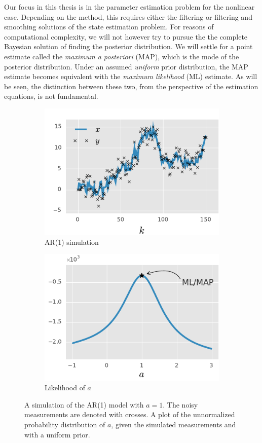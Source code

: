 Our focus in this thesis is in the parameter estimation problem for the nonlinear case.
Depending on the method, this requires either the filtering or filtering and smoothing
solutions of the state estimation problem. For reasons of computational complexity, we will not however try to pursue
the the complete Bayesian solution of finding the posterior distribution. We will settle
for a point estimate called the \emph{maximum a posteriori} (MAP), which is the mode
of the posterior distribution. Under an assumed \emph{uniform} prior distribution,
the MAP estimate becomes equivalent with the \emph{maximum likelihood} (ML) estimate.
As will be seen, the distinction between these two, from the perspective of the
estimation equations, is not fundamental.
%
% 
\begin{figure}[htb]%
    \centering%
    \begin{subfigure}[t]{0.5\textwidth}%
    	\caption{AR(1) simulation}\label{fig:ar1_simulation}%
    	\includegraphics{img/ar1_ex_a}%
    \end{subfigure}%
    \begin{subfigure}[t]{0.5\textwidth}\centering%
		\caption{Likelihood of $a$}\label{fig:ar1_lh}%
		\includegraphics{img/ar1_ex_b}%
    \end{subfigure}%
	\caption{%
	 A simulation of the AR(1) model with $a=1$.%
   	The noisy measurements are denoted with crosses. %
   	 A plot of the unnormalized probability distribution of $a$, given the simulated measurements and with a uniform prior.%
   	}
	\label{fig:ar1}
 \end{figure}
